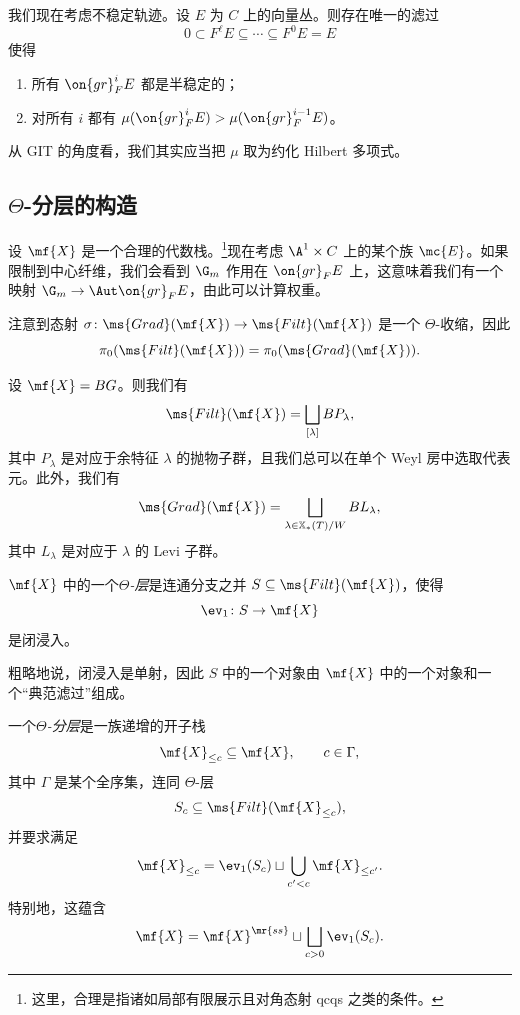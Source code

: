 我们现在考虑不稳定轨迹。设 \(E\) 为 \(C\) 上的向量丛。则存在唯一的滤过
\[ 0 \subset F^{\ell} E \subseteq \cdots \subseteq F^0 E = E \]
使得
\begin{enumerate}
    \item 所有 \(\on{gr}_F^i E\) 都是半稳定的；
    \item 对所有 \(i\) 都有 \(\mu(\on{gr}_F^i E) > \mu(\on{gr}_F^{i-1} E)\)。 
\end{enumerate}
\begin{rmk}
    从 GIT 的角度看，我们其实应当把 \(\mu\) 取为约化 Hilbert 多项式。
\end{rmk}

\subsection{\(\Theta\)-分层的构造}%
\label{sub:Construction of Theta-stratifications}

设 \(\mf{X}\) 是一个合理的代数栈。\footnote{这里，合理是指诸如局部有限展示且对角态射 qcqs 之类的条件。}现在考虑 \(\A^1 \times C\) 上的某个族 \(\mc{E}\)。如果限制到中心纤维，我们会看到 \(\G_m\) 作用在 \(\on{gr}_F E\) 上，这意味着我们有一个映射 \(\G_m \to \Aut \on{gr}_F E\)，由此可以计算权重。 

注意到态射 \(\sigma \colon \ms{Grad}(\mf{X}) \to \ms{Filt}(\mf{X})\) 是一个 \(\Theta\)-收缩，因此
\[ \pi_0(\ms{Filt}(\mf{X})) = \pi_0(\ms{Grad}(\mf{X})). \]

\begin{exm}
    设 \(\mf{X} = BG\)。则我们有
    \[\ms{Filt}(\mf{X}) = \bigsqcup_{[\lambda]} B P_{\lambda}, \]
    其中 \(P_{\lambda}\) 是对应于余特征 \(\lambda\) 的抛物子群，且我们总可以在单个 Weyl 房中选取代表元。此外，我们有
    \[ \ms{Grad}(\mf{X}) = \bigsqcup_{\lambda \in \mathbb{X}_*(T)/W} B L_{\lambda}, \]
    其中 \(L_{\lambda}\) 是对应于 \(\lambda\) 的 Levi 子群。
\end{exm}

\begin{defn}
    \(\mf{X}\) 中的一个\textit{\(\Theta\)-层}是连通分支之并 \(S \subseteq \ms{Filt}(\mf{X})\)，使得
    \[ \ev_1 \colon S \to \mf{X} \]
    是闭浸入。
\end{defn}

粗略地说，闭浸入是单射，因此 \(S\) 中的一个对象由 \(\mf{X}\) 中的一个对象和一个“典范滤过”组成。

\begin{defn}
    一个\textit{\(\Theta\)-分层}是一族递增的开子栈
    \[ \mf{X}_{\leq c} \subseteq \mf{X}, \qquad c \in \Gamma, \]
    其中 \(\Gamma\) 是某个全序集，连同 \(\Theta\)-层
    \[ S_c \subseteq \ms{Filt}(\mf{X}_{\leq c}), \]
    并要求满足
    \[ \mf{X}_{\leq c} = \ev_1(S_c) \sqcup \bigcup_{c' < c} \mf{X}_{\leq c'}. \]
    特别地，这蕴含
    \[ \mf{X} = \mf{X}^{\mr{ss}} \sqcup \bigsqcup_{c > 0} \ev_1(S_c). \]
\end{defn}

